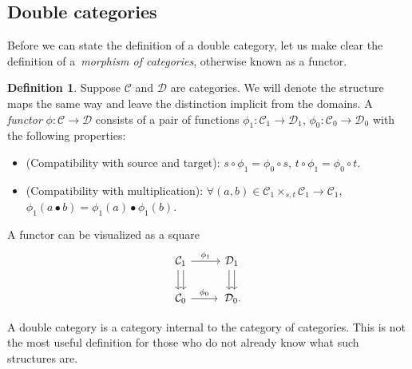 \documentclass[10pt,a4paper]{amsart}
\numberwithin{equation}{section}
\theoremstyle{definition}
\newtheorem{Definition}[Theorem]{Definition}
\newcommand{\CC}{\mathcal{C}}
\newcommand{\CD}{\mathcal{D}}
\newcommand{\darrow}{\arrow[d, shift right] \arrow[d, shift left]}
\begin{document}
\subsection{Double categories}
Before we can state the definition of a double category, let us make clear the definition of a~\emph{morphism of categories}, otherwise known as a functor.
\begin{Definition}
   Suppose $ \CC $ and $ \CD $ are categories. We will denote the structure maps the same way and leave the distinction implicit from the domains. A \emph{functor} $ \phi \colon \CC \to \CD $ consists of a pair of functions
  $\phi_1 \colon \CC_1 \to \CD_1$, $\phi_0 \colon \CC_0 \to \CD_0$
  with the following properties:
  \begin{itemize}\itemsep=0pt
    \item (Compatibility with source and target):
    $s \circ \phi_1 = \phi_0 \circ s$, $t \circ \phi_1 = \phi_0 \circ t$.
    \item (Compatibility with multiplication):
    $\forall (a,b) \in \CC_1 \times_{s,t} \CC_1 \to \CC_1$, $ \phi_1(a \bullet b) = \phi_1(a) \bullet \phi_1(b) $.
  \end{itemize}
  A functor can be visualized as a square
  \[\begin{tikzcd}
    \CC_1 \darrow \arrow[r, "\phi_1"] & \CD_1 \darrow \\
    \CC_0 \arrow[r, "\phi_0"] &\, \CD_0.
  \end{tikzcd}\]
\end{Definition}
A double category is a category internal to the category of categories. This is not the most useful definition for those who do not already know what such structures are.
\end{document}
